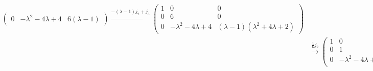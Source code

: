 \documentclass[../../main.tex]{subfiles}
\begin{document}
\begin{solution}
\begin{align*}
\begin{pmatrix}
0 & -\lambda^2 - 4\lambda + 4 & 6(\lambda - 1)
\end{pmatrix}
\xrightarrow{-(\lambda-1)j_2+j_3}
\begin{pmatrix}
1 & 0 & 0 \\
0 & 6 & 0 \\
0 & -\lambda^2 - 4\lambda + 4 & (\lambda - 1)(\lambda^2 + 4\lambda + 2)
\end{pmatrix}\\
&\xrightarrow{\frac{1}{6}j_2}
\begin{pmatrix}
1 & 0 & 0 \\
0 & 1 & 0 \\
0 & -\lambda^2 - 4\lambda + 4 & (\lambda - 1)(\lambda^2 + 4\lambda + 2)
\end{pmatrix}
\xrightarrow{-(-\lambda^2 - 4\lambda + 4)r_2+r_3}
\begin{pmatrix}
1 & 0 & 0 \\
0 & 1 & 0 \\
0 & 0 & (\lambda - 1)(\lambda^2 + 4\lambda + 2)
\end{pmatrix}.
\end{align*} 
\end{solution}
\end{document}
